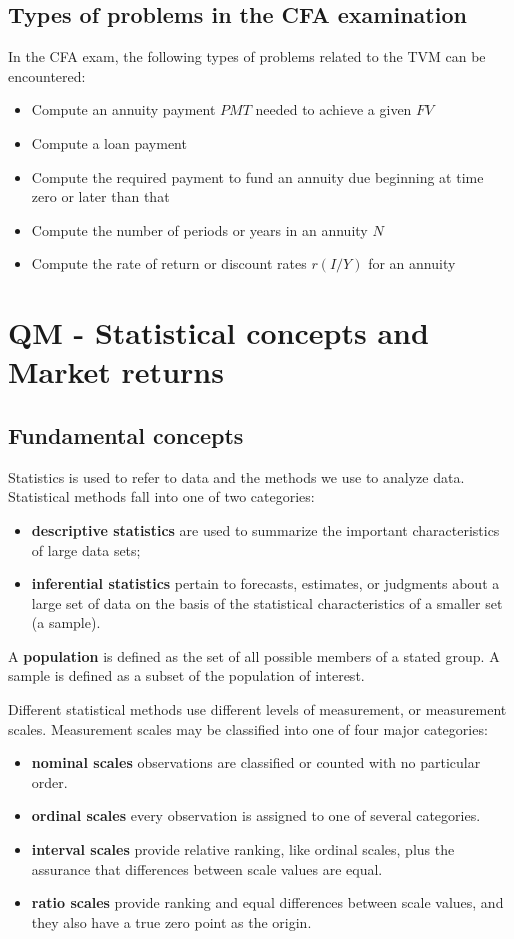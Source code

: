\subsection{Types of problems in the CFA examination}
In the CFA exam, the following types of problems related to the TVM can be encountered:
\begin{itemize}
	\setlength\itemsep{0em}
	\item Compute an annuity payment $PMT$ needed to achieve a given $FV$
	\item Compute a loan payment
	\item Compute the required payment to fund an annuity due beginning at time zero or later than that
	\item Compute the number of periods or years in an annuity $N$
	\item Compute the rate of return or discount rates $r (I/Y)$ for an annuity
\end{itemize}



\section{QM - Statistical concepts and Market returns}

\subsection{Fundamental concepts}
Statistics is used to refer to data and the methods we use to analyze data. Statistical methods fall into one of two categories:
\begin{itemize}
	\setlength\itemsep{0em}
	\item \textbf{descriptive statistics} are used to summarize the important characteristics of large data sets;
	\item \textbf{inferential statistics} pertain to forecasts, estimates, or judgments about a large set of data on the basis of the statistical characteristics of a smaller set (a sample).
\end{itemize}

A \textbf{population} is defined as the set of all possible members of a stated group. A sample is defined as a subset of the population of interest. 

Different statistical methods use different levels of measurement, or measurement scales. Measurement scales may be classified into one of four major categories:
\begin{itemize}
	\setlength\itemsep{0em}
	\item \textbf{nominal scales} observations are classified or counted with no particular order.
	\item \textbf{ordinal scales} every observation is assigned to one of several categories.
	\item \textbf{interval scales} provide relative ranking, like ordinal scales, plus the assurance that differences between scale values are equal.
	\item \textbf{ratio scales} provide ranking and equal differences between scale values, and they also have a true zero point as the origin.
\end{itemize}

